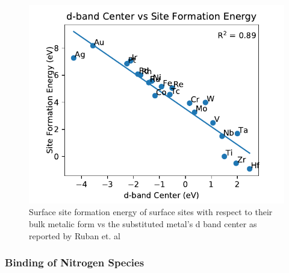 \begin{figure}
    \centering
    \includegraphics[width=0.8\linewidth]{Images/d_band_vs_formation.pdf}
    \caption{Surface site formation energy of surface sites with respect to their bulk metalic form vs the substituted metal's d band center as reported by Ruban et. al \cite{Ruban_1997}}
    \label{fig:d_band}
\end{figure}


\subsubsection{Binding of Nitrogen Species}

